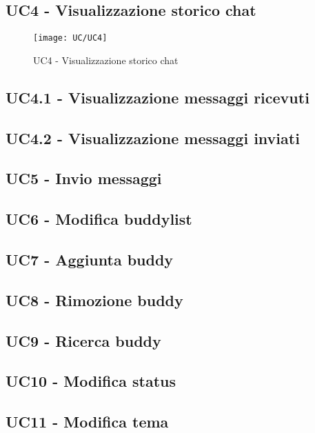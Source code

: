 \subsection{UC4 - Visualizzazione storico chat}
\begin{figure}[H] 
	\centering
	\texttt{[image: UC/UC4]}
	\caption{UC4 - Visualizzazione storico chat}
\end{figure}

\subsection{UC4.1 - Visualizzazione messaggi ricevuti}
\subsection{UC4.2 - Visualizzazione messaggi inviati}

\subsection{UC5 - Invio messaggi}
\subsection{UC6 - Modifica buddylist}
\subsection{UC7 - Aggiunta buddy}
\subsection{UC8 - Rimozione buddy}
\subsection{UC9 - Ricerca buddy}
\subsection{UC10 - Modifica status}
\subsection{UC11 - Modifica tema}
